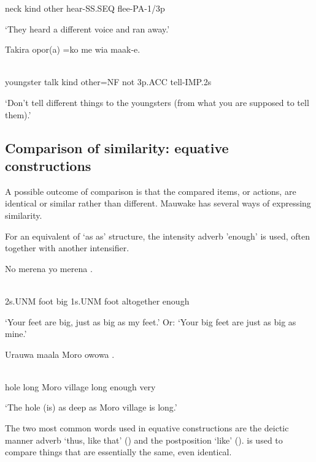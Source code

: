 neck  kind  other  hear-SS.SEQ  flee-PA-1/3p

`They heard a different voice and ran away.'

\ea%
\label{ex:x1335}
\gll Takira  opor(a)  =ko  me  wia  maak-e. \\
      \\
\glt
\z

youngster  talk  kind  other=NF  not  3p.ACC  tell-IMP.2s

`Don't tell different things to the youngsters (from what you are supposed to tell them).'

\subsection{Comparison of similarity: equative constructions}\footnotemark{}
\hypertarget{RefHeading22661935131865}{}
A possible outcome of comparison is that the compared items, or actions, are identical or similar rather than different. Mauwake has several ways of expressing similarity. 

For an equivalent of  `as  as' structure, the intensity adverb  'enough' is used, often together with another intensifier.

\ea%
\label{ex:x1331}
\gll No  merena    yo  merena  . \\
      \\
\glt
\z

2s.UNM  foot  big  1s.UNM  foot  altogether  enough

`Your feet are big, just as big as my feet.' Or: `Your big feet are just as big as mine.'

\ea%
\label{ex:x1332}
\gll Urauwa  maala  Moro  owowa  . \\
      \\
\glt
\z

hole  long  Moro  village  long  enough  very

`The hole (is) as deep as Moro village is long.'

The two most common words used in equative constructions are the deictic manner adverb  `thus, like that' () and the postposition  `like' ().  is used to compare things that are essentially the same, even identical.

